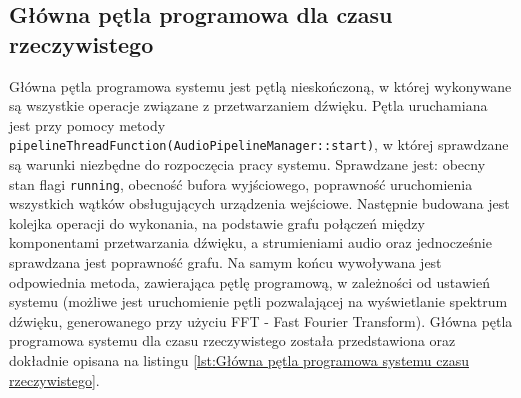 \subsection{Główna pętla programowa dla czasu rzeczywistego}
Główna pętla programowa systemu jest pętlą nieskończoną, w której wykonywane są wszystkie operacje związane z przetwarzaniem dźwięku. Pętla uruchamiana jest przy pomocy metody \texttt{pipelineThreadFunction(AudioPipelineManager::start)}, w której sprawdzane są warunki niezbędne do rozpoczęcia pracy systemu. Sprawdzane jest: obecny stan flagi \texttt{running}, obecność bufora wyjściowego, poprawność uruchomienia wszystkich wątków obsługujących urządzenia wejściowe. Następnie budowana jest kolejka operacji do wykonania, na podstawie grafu połączeń między komponentami przetwarzania dźwięku, a strumieniami audio oraz jednocześnie sprawdzana jest poprawność grafu. Na samym końcu wywoływana jest odpowiednia metoda, zawierająca pętlę programową, w zależności od ustawień systemu (możliwe jest uruchomienie pętli pozwalającej na wyświetlanie spektrum dźwięku, generowanego przy użyciu FFT - Fast Fourier Transform). Główna pętla programowa systemu dla czasu rzeczywistego została przedstawiona oraz dokładnie opisana na listingu \ref{lst:Główna pętla programowa systemu czasu rzeczywistego}. 

